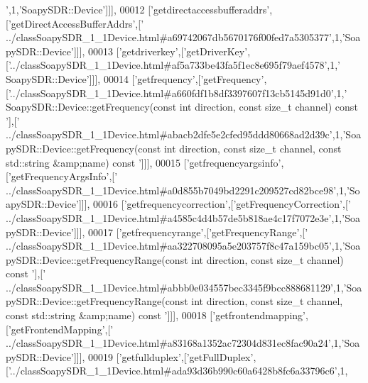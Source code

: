 \begin{DoxyCode}
{      '},1,\textcolor{stringliteral}{'SoapySDR::Device'}]]],
00012   [\textcolor{stringliteral}{'getdirectaccessbufferaddrs'},[\textcolor{stringliteral}{'getDirectAccessBufferAddrs'},[\textcolor{stringliteral}{'
      ../classSoapySDR\_1\_1Device.html#a69742067db5670176f00fed7a5305377'},1,\textcolor{stringliteral}{'SoapySDR::Device'}]]],
00013   [\textcolor{stringliteral}{'getdriverkey'},[\textcolor{stringliteral}{'getDriverKey'},[\textcolor{stringliteral}{'../classSoapySDR\_1\_1Device.html#af5a733be43fa5f1ec8e695f79aef4578'},1,\textcolor{stringliteral}{'
      SoapySDR::Device'}]]],
00014   [\textcolor{stringliteral}{'getfrequency'},[\textcolor{stringliteral}{'getFrequency'},[\textcolor{stringliteral}{'../classSoapySDR\_1\_1Device.html#a660fdf1b8df3397607f13cb5145d91d0'},1,\textcolor{stringliteral}{'
      SoapySDR::Device::getFrequency(const int direction, const size\_t channel) const '}],[\textcolor{stringliteral}{'
      ../classSoapySDR\_1\_1Device.html#abacb2dfe5e2cfed95ddd80668ad2d39c'},1,\textcolor{stringliteral}{'SoapySDR::Device::getFrequency(const int direction, const
       size\_t channel, const std::string &amp;name) const '}]]],
00015   [\textcolor{stringliteral}{'getfrequencyargsinfo'},[\textcolor{stringliteral}{'getFrequencyArgsInfo'},[\textcolor{stringliteral}{'
      ../classSoapySDR\_1\_1Device.html#a0d855b7049bd2291c209527cd82bce98'},1,\textcolor{stringliteral}{'SoapySDR::Device'}]]],
00016   [\textcolor{stringliteral}{'getfrequencycorrection'},[\textcolor{stringliteral}{'getFrequencyCorrection'},[\textcolor{stringliteral}{'
      ../classSoapySDR\_1\_1Device.html#a4585c4d4b57de5b818ae4c17f7072e3e'},1,\textcolor{stringliteral}{'SoapySDR::Device'}]]],
00017   [\textcolor{stringliteral}{'getfrequencyrange'},[\textcolor{stringliteral}{'getFrequencyRange'},[\textcolor{stringliteral}{'
      ../classSoapySDR\_1\_1Device.html#aa322708095a5e203757f8c47a159bc05'},1,\textcolor{stringliteral}{'SoapySDR::Device::getFrequencyRange(const int direction, const size\_t channel) const '}],[\textcolor{stringliteral}{'
      ../classSoapySDR\_1\_1Device.html#abbb0e034557bec3345f9bcc888681129'},1,\textcolor{stringliteral}{'SoapySDR::Device::getFrequencyRange(const int
       direction, const size\_t channel, const std::string &amp;name) const '}]]],
00018   [\textcolor{stringliteral}{'getfrontendmapping'},[\textcolor{stringliteral}{'getFrontendMapping'},[\textcolor{stringliteral}{'
      ../classSoapySDR\_1\_1Device.html#a83168a1352ac72304d831ec8fac90a24'},1,\textcolor{stringliteral}{'SoapySDR::Device'}]]],
00019   [\textcolor{stringliteral}{'getfullduplex'},[\textcolor{stringliteral}{'getFullDuplex'},[\textcolor{stringliteral}{'../classSoapySDR\_1\_1Device.html#ada93d36b990c60a6428b8fc6a33796c6'},1,\textcolor{stringliteral}{
}
\end{DoxyCode}
